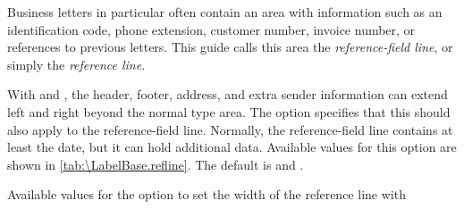 \begin{Declaration}
\end{Declaration}
%
%
Business letters in particular often contain an area with information such as
an identification code, phone
extension, customer number,
invoice number, or references to previous letters. This
guide calls this area the \emph{reference-field line}, or simply the \emph{reference line}.

With  and  , the header, footer, address,
and extra sender information can extend left and right beyond the normal
type area. The
 option
specifies that this should also apply to the reference-field line. Normally,
the reference-field line contains at least the date, but it can hold
additional data. Available values for this option are shown in
\autoref{tab:\LabelBase.refline}. The default is  and
.%
%
\begin{table}
  \caption[{Available values for the  option with
    }]{Available values for the  option to set
    the width of the reference line with }
  \label{tab:\LabelBase.refline}
  \begin{desctabular}
  \end{desctabular}
\end{table}

